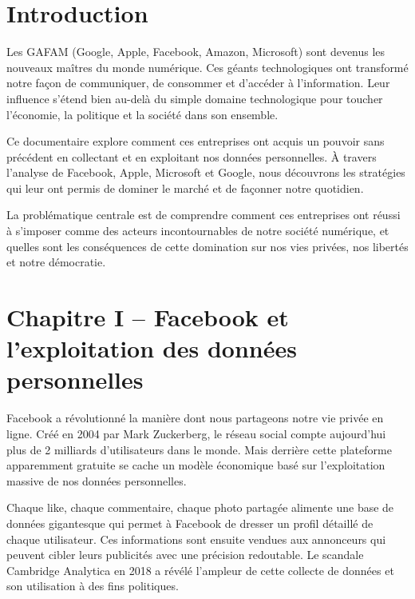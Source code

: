 \documentclass[12pt,a4paper]{article}
\begin{document}
\tableofcontents
\newpage

\section*{Introduction}

Les GAFAM (Google, Apple, Facebook, Amazon, Microsoft) sont devenus les nouveaux maîtres du monde numérique. Ces géants technologiques ont transformé notre façon de communiquer, de consommer et d'accéder à l'information. Leur influence s'étend bien au-delà du simple domaine technologique pour toucher l'économie, la politique et la société dans son ensemble.

Ce documentaire explore comment ces entreprises ont acquis un pouvoir sans précédent en collectant et en exploitant nos données personnelles. À travers l'analyse de Facebook, Apple, Microsoft et Google, nous découvrons les stratégies qui leur ont permis de dominer le marché et de façonner notre quotidien.

La problématique centrale est de comprendre comment ces entreprises ont réussi à s'imposer comme des acteurs incontournables de notre société numérique, et quelles sont les conséquences de cette domination sur nos vies privées, nos libertés et notre démocratie.

\newpage

\section*{Chapitre I -- Facebook et l'exploitation des données personnelles}

Facebook a révolutionné la manière dont nous partageons notre vie privée en ligne. Créé en 2004 par Mark Zuckerberg, le réseau social compte aujourd'hui plus de 2 milliards d'utilisateurs dans le monde. Mais derrière cette plateforme apparemment gratuite se cache un modèle économique basé sur l'exploitation massive de nos données personnelles.

Chaque like, chaque commentaire, chaque photo partagée alimente une base de données gigantesque qui permet à Facebook de dresser un profil détaillé de chaque utilisateur. Ces informations sont ensuite vendues aux annonceurs qui peuvent cibler leurs publicités avec une précision redoutable. Le scandale Cambridge Analytica en 2018 a révélé l'ampleur de cette collecte de données et son utilisation à des fins politiques.
\end{document}
